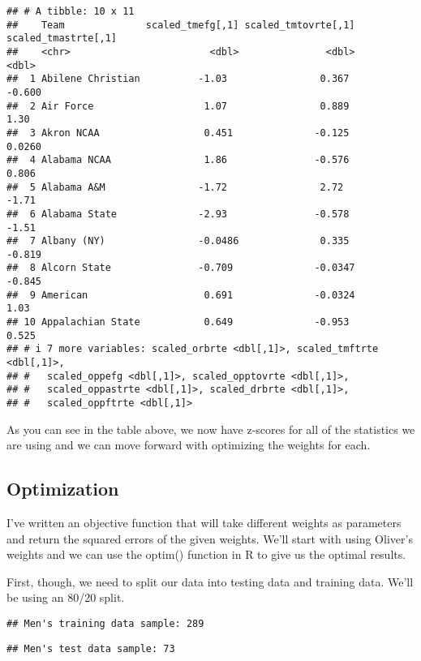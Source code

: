 \documentclass[
]{article}
\begin{document}
\begin{verbatim}
## # A tibble: 10 x 11
##    Team              scaled_tmefg[,1] scaled_tmtovrte[,1] scaled_tmastrte[,1]
##    <chr>                        <dbl>               <dbl>               <dbl>
##  1 Abilene Christian          -1.03                0.367              -0.600 
##  2 Air Force                   1.07                0.889               1.30  
##  3 Akron NCAA                  0.451              -0.125               0.0260
##  4 Alabama NCAA                1.86               -0.576               0.806 
##  5 Alabama A&M                -1.72                2.72               -1.71  
##  6 Alabama State              -2.93               -0.578              -1.51  
##  7 Albany (NY)                -0.0486              0.335              -0.819 
##  8 Alcorn State               -0.709              -0.0347             -0.845 
##  9 American                    0.691              -0.0324              1.03  
## 10 Appalachian State           0.649              -0.953               0.525 
## # i 7 more variables: scaled_orbrte <dbl[,1]>, scaled_tmftrte <dbl[,1]>,
## #   scaled_oppefg <dbl[,1]>, scaled_opptovrte <dbl[,1]>,
## #   scaled_oppastrte <dbl[,1]>, scaled_drbrte <dbl[,1]>,
## #   scaled_oppftrte <dbl[,1]>
\end{verbatim}

As you can see in the table above, we now have z-scores for all of the
statistics we are using and we can move forward with optimizing the
weights for each.

\subsection{Optimization}\label{optimization}

I've written an objective function that will take different weights as
parameters and return the squared errors of the given weights. We'll
start with using Oliver's weights and we can use the optim() function in
R to give us the optimal results.

First, though, we need to split our data into testing data and training
data. We'll be using an 80/20 split.

\begin{verbatim}
## Men's training data sample: 289
\end{verbatim}

\begin{verbatim}
## Men's test data sample: 73
\end{verbatim}
\end{document}
